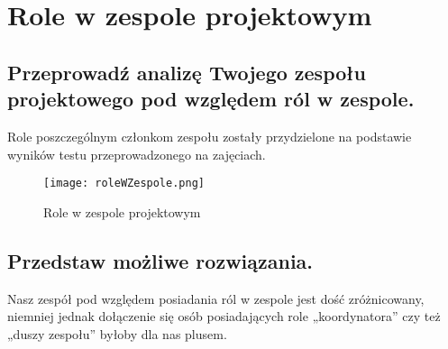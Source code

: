 
\section{Role w zespole projektowym}

\subsection*{Przeprowadź analizę Twojego zespołu projektowego pod względem ról w zespole.}

Role poszczególnym członkom zespołu zostały przydzielone na podstawie wyników testu przeprowadzonego na zajęciach.

\begin{figure}[!h]
\centering
\texttt{[image: roleWZespole.png]}
\caption{Role w zespole projektowym}
\label{fig:roleWZespole}
\end{figure}

\subsection*{Przedstaw możliwe rozwiązania.}

Nasz zespół pod względem posiadania ról w zespole jest dość zróżnicowany, niemniej jednak dołączenie się osób posiadających role „koordynatora” czy też „duszy zespołu” byłoby dla nas plusem.


